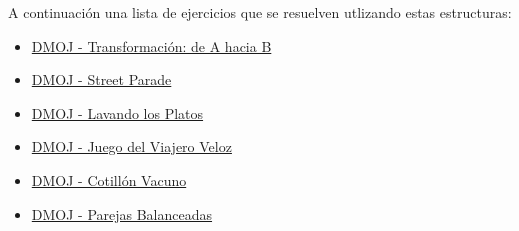 A continuación una lista de ejercicios que se resuelven utlizando estas estructuras:

\begin{itemize}
	\item \href{https://dmoj.uclv.edu.cu/problem/froma2b}{DMOJ - Transformación: de A hacia B}	
	\item \href{https://dmoj.uclv.edu.cu/problem/streetparade}{DMOJ - Street Parade}
	\item \href{https://dmoj.uclv.edu.cu/problem/stdishes}{DMOJ - Lavando los Platos}
	\item \href{https://dmoj.uclv.edu.cu/problem/veloz}{DMOJ - Juego del Viajero Veloz}
	\item \href{https://dmoj.uclv.edu.cu/problem/dance2}{DMOJ - Cotillón Vacuno}
	\item \href{https://dmoj.uclv.edu.cu/problem/balan}{DMOJ - Parejas Balanceadas}
\end{itemize}